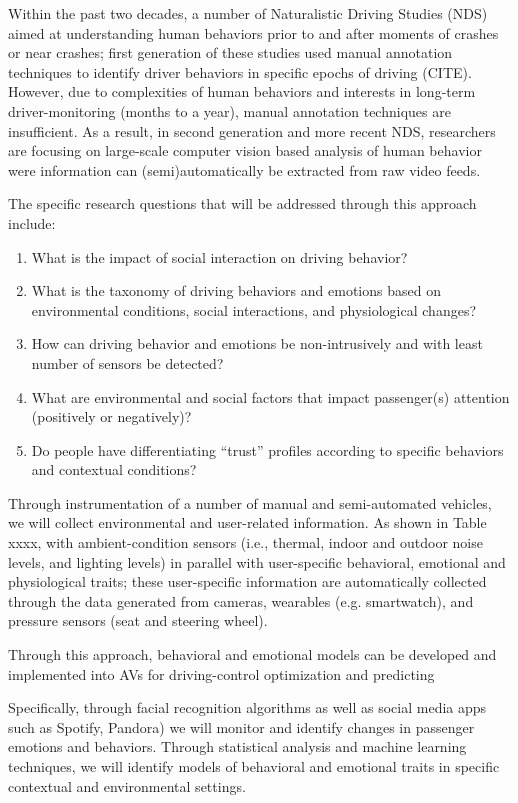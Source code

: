  Within the past two decades, a number of Naturalistic Driving Studies (NDS) aimed at understanding human behaviors prior to and after moments of crashes or near crashes; first generation of these studies used manual annotation techniques to identify driver behaviors in specific epochs of driving (CITE). However, due to complexities of human behaviors and  interests in long-term driver-monitoring (months to a year), manual annotation techniques are insufficient. As a result, in second generation and more recent NDS, researchers are focusing on large-scale computer vision based analysis of human behavior were information can (semi)automatically be extracted from raw video feeds.     
 
 The specific research questions that will be addressed through this approach include: 
\begin{enumerate}
    \item What is the impact of social interaction on driving behavior? 
    \item What is the taxonomy of driving behaviors and emotions based on environmental conditions, social interactions, and physiological changes?
    \item How can driving behavior and emotions be non-intrusively and with least number of sensors be detected?
    \item What are environmental and social factors that impact passenger(s) attention (positively or negatively)? 
    \item Do people have differentiating “trust” profiles according to specific behaviors and contextual conditions?  

\end{enumerate}

Through instrumentation of a number of manual and semi-automated vehicles, we will collect environmental and user-related information. As shown in Table xxxx,  with ambient-condition sensors (i.e., thermal, indoor and outdoor noise levels, and lighting levels) in parallel with user-specific behavioral, emotional and physiological traits; these user-specific information are automatically collected through the data generated from cameras, wearables (e.g. smartwatch), and pressure sensors (seat and steering wheel). 

Through this approach, behavioral and emotional models can be developed and implemented into AVs for driving-control optimization and predicting


Specifically, through facial recognition algorithms as well as social media apps such as Spotify, Pandora) we will monitor and identify changes in passenger emotions and behaviors. Through statistical analysis and machine learning techniques, we will identify models of behavioral and emotional traits in specific contextual and environmental settings. 

